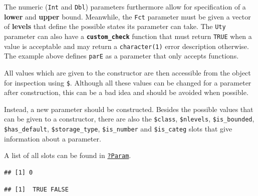 \documentclass[]{article}
\newenvironment{Shaded}{\begin{snugshade}}{\end{snugshade}}
\newcommand{\NormalTok}[1]{#1}
\newcommand{\OperatorTok}[1]{\textcolor[rgb]{0.81,0.36,0.00}{\textbf{#1}}}
\renewenvironment{Shaded} {\begin{snugshade}\small} {\end{snugshade}}
\begin{document}
The numeric (\texttt{Int} and \texttt{Dbl}) parameters furthermore allow for specification of a \textbf{lower} and \textbf{upper} bound.
Meanwhile, the \texttt{Fct} parameter must be given a vector of \textbf{levels} that define the possible states its parameter can take.
The \texttt{Uty} parameter can also have a \textbf{\texttt{custom\_check}} function that must return \texttt{TRUE} when a value is acceptable and may return a \texttt{character(1)} error description otherwise.
The example above defines \texttt{parE} as a parameter that only accepts functions.

All values which are given to the constructor are then accessible from the object for inspection using \texttt{\$}.
Although all these values can be changed for a parameter after construction, this can be a bad idea and should be avoided when possible.

Instead, a new parameter should be constructed.
Besides the possible values that can be given to a constructor, there are also the \texttt{\$class}, \texttt{\$nlevels}, \texttt{\$is\_bounded}, \texttt{\$has\_default}, \texttt{\$storage\_type}, \texttt{\$is\_number} and \texttt{\$is\_categ} slots that give information about a parameter.

A list of all slots can be found in \href{https://paradox.mlr-org.com/reference/Param.html}{\texttt{?Param}}.

\begin{Shaded}
\end{Shaded}

\begin{verbatim}
## [1] 0
\end{verbatim}

\begin{Shaded}
\end{Shaded}

\begin{verbatim}
## [1]  TRUE FALSE
\end{verbatim}

\begin{Shaded}
\end{Shaded}
\end{document}

